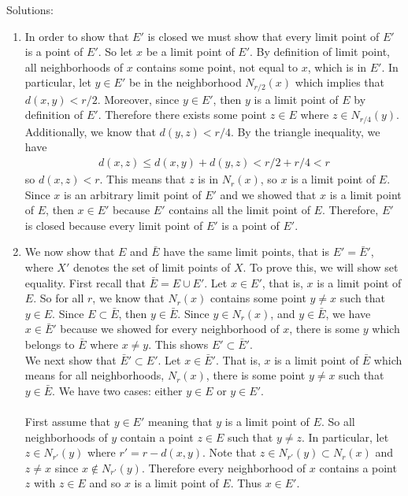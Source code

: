 \documentclass[12pt]{article}
\begin{document}
Solutions:

\begin{enumerate}
\item In order to show that $E'$ is closed we must show that every limit point of $E'$ is a point of $E'$. So let $x$ be a limit point of $E'$. By definition of limit point, all neighborhoods of $x$ contains some point, not equal to $x$, which is in $E'$. In particular, let $y \in E'$ be in the neighborhood $N_{r/2}(x)$ which implies that $d(x,y)< r/2$. Moreover, since $y \in E'$, then $y$ is a limit point of $E$ by definition of $E'$. Therefore there exists some point $z \in E$ where $z \in N_{r/4}(y)$. Additionally, we know that $d(y,z)<r/4$. By the triangle inequality, we have 
\begin{align*}
d(x,z) \leq d(x,y) + d(y,z) < r/2 + r/4 < r
\end{align*} 
so $d(x,z)<r$. This means that $z$ is in $N_{r}(x)$, so $x$ is a limit point of $E$. Since $x$ is an arbitrary limit point of $E'$ and we showed that $x$ is a limit point of $E$, then $x \in E'$ because $E'$ contains all the limit point of $E$. Therefore, $E'$ is closed because every limit point of $E'$ is a point of $E'$. \\

\item We now show that $E$ and $\bar{E}$ have the same limit points, that is $E'=\bar{E}'$, where $X'$ denotes the set of limit points of $X$. To prove this, we will show set equality. First recall that $\bar{E} = E \cup E'$. Let $x \in E'$, that is, $x$ is a limit point of $E$. So for all $r$, we know that $N_{r}(x)$ contains some point $y \neq x$ such that $y \in E$. Since $E \subset \bar{E}$, then $y \in \bar{E}$. Since $y \in N_{r}(x)$, and $y \in \bar{E}$, we have $x \in \bar{E}'$ because we showed for every neighborhood of $x$, there is some $y$ which belongs to $\bar{E}$ where $x \neq y$. This shows $E' \subset \bar{E}'$. \\ 

We next show that $\bar{E}' \subset E'$. Let $x \in \bar{E}'$. That is, $x$ is a limit point of $\bar{E}$ which means for all neighborhoods, $N_{r}(x)$, there is some point $y \neq x$ such that $y \in \bar{E}$. We have two cases: either $y \in E$ or $y \in E'$. \\ \\
First assume that $y \in E'$ meaning that $y$ is a limit point of $E$. So all neighborhoods of $y$ contain a point $z \in E$ such that $y \neq z$. In particular, let $z \in N_{r'}(y)$ where $r' = r - d(x,y)$. Note that $z \in N_{r'}(y) \subset N_{r}(x)$ and $z \neq x$ since $x \notin N_{r'}(y)$. Therefore every neighborhood of $x$ contains a point $z$ with $z \in E$ and so $x$ is a limit point of $E$. Thus $x \in E'$. \\ 


\end{enumerate}
\end{document}
